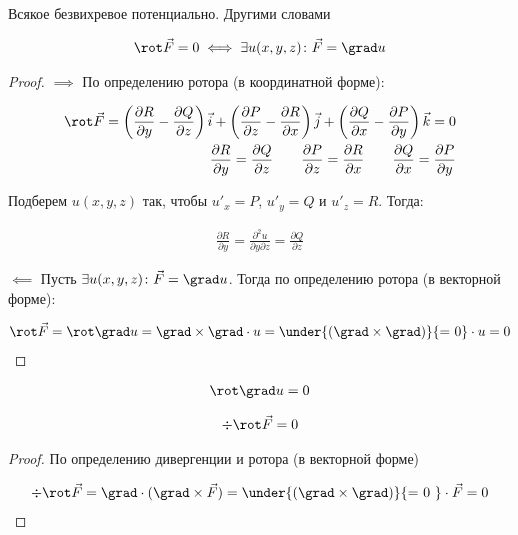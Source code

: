 \begin{theorem}\label{potential-field}
  Всякое безвихревое потенциально. Другими словами

  \begin{align*}
    \rot \vec{F} = 0 \iff \exists u(x, y, z) \colon \vec{F} = \grad u
  \end{align*}
\end{theorem}
\begin{proof}
  \(\implies\) По определению ротора (в координатной форме):

  \begin{align*}
    \rot \vec{F} =
    \left(\frac{\partial R}{\partial y} - \frac{\partial Q}{\partial z}\right)
      \vec{i} +
    \left(\frac{\partial P}{\partial z} - \frac{\partial R}{\partial x}\right)
      \vec{j} +
    \left(\frac{\partial Q}{\partial x} - \frac{\partial P}{\partial y}\right)
      \vec{k}
    = 0
    \\
    \frac{\partial R}{\partial y} = \frac{\partial Q}{\partial z}
    \qquad
    \frac{\partial P}{\partial z} = \frac{\partial R}{\partial x}
    \qquad
    \frac{\partial Q}{\partial x} = \frac{\partial P}{\partial y}
  \end{align*}

  Подберем \(u(x, y, z)\) так, чтобы \(u'_{x} = P\), \(u'_{y} = Q\) и
  \(u'_{z} = R\). Тогда:

  \begin{align*}
    \frac{\partial R}{\partial y}
    = \frac{\partial^2 u}{\partial y \partial z} 
    = \frac{\partial Q}{\partial z}
  \end{align*}

  \(\impliedby\) Пусть \(\exists u(x, y, z) \colon \vec{F} = \grad u\).
  Тогда по определению ротора (в векторной форме):

  \begin{align*}
    \rot \vec{F}
    = \rot \grad u
    = \grad \times \grad \cdot u
    = \under{(\grad \times \grad)}{\text{= 0}} \cdot u
    = 0
  \end{align*}
\end{proof}

\begin{corollary}
  \begin{align*}
    \rot \grad u = 0
  \end{align*}
\end{corollary}

\begin{theorem}
  \begin{align*}
    \div \rot \vec{F} = 0
  \end{align*}
\end{theorem}
\begin{proof}
  По определению дивергенции и ротора (в векторной форме)

  \begin{align*}
    \div \rot \vec{F}
    = \grad \cdot (\grad \times \vec{F})
    = \under{(\grad \times \grad)}{\text{= 0 }} \cdot \vec{F}
    = 0
  \end{align*}
\end{proof}
